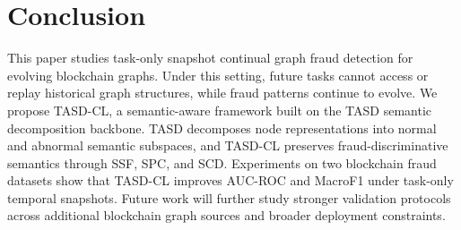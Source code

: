 \section{Conclusion}
\label{sec:conclusion}

This paper studies task-only snapshot continual graph fraud detection for evolving blockchain graphs. Under this setting, future tasks cannot access or replay historical graph structures, while fraud patterns continue to evolve. We propose TASD-CL, a semantic-aware framework built on the TASD semantic decomposition backbone. TASD decomposes node representations into normal and abnormal semantic subspaces, and TASD-CL preserves fraud-discriminative semantics through SSF, SPC, and SCD. Experiments on two blockchain fraud datasets show that TASD-CL improves AUC-ROC and MacroF1 under task-only temporal snapshots. Future work will further study stronger validation protocols across additional blockchain graph sources and broader deployment constraints.
